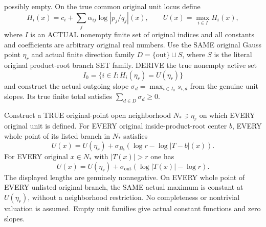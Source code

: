 \begin{theorem}
possibly empty. On the true common original unit locus define
\[
 H_i(x)=c_i+\sum_j\alpha_{ij}\log|p_j/q_j|(x),\qquad
 U(x)=\max_{i\in I}H_i(x),
\]
where $I$ is an ACTUAL nonempty finite set of original indices and all
constants and coefficients are arbitrary original real numbers. Use the
SAME original Gauss point $\eta_r$ and actual finite direction family
$D=\{\mathrm{out}\}\sqcup S$, where $S$ is the literal original
product-root branch SET family. DERIVE the true nonempty active set
\[
 I_0=\{i\in I:H_i(\eta_r)=U(\eta_r)\}
\]
and construct the actual outgoing slope
$\sigma_d=\max_{i\in I_0}s_{i,d}$ from the genuine unit slopes.
Its true finite total satisfies $\sum_{d\in D}\sigma_d\ge0$.

Construct a TRUE original-point open neighborhood $N_*\ni\eta_r$ on
which EVERY original unit is defined. For EVERY original inside-product-root
center $b$, EVERY whole point of its listed branch in $N_*$ satisfies
\[
 U(x)=U(\eta_r)+\sigma_{B_b}
                  (\log r-\log|T-b|(x)).
\]
For EVERY original $x\in N_*$ with $|T(x)|>r$ one has
\[
 U(x)=U(\eta_r)+\sigma_{\mathrm{out}}
                  (\log|T(x)|-\log r).
\]
The displayed lengths are genuinely nonnegative. On EVERY whole point of
EVERY unlisted original branch, the SAME actual maximum is constant at
$U(\eta_r)$, without a neighborhood restriction. No completeness or
nontrivial valuation is assumed. Empty unit families give actual constant
functions and zero slopes.
\end{theorem}
